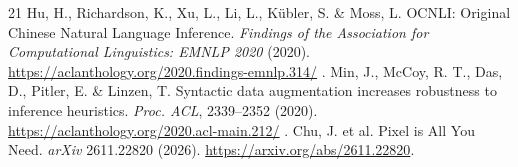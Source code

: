 \documentclass[12pt,a4paper]{article}
\providecommand{\DIFadd}[1]{{\protect\color{blue} \sf #1}} %
\providecommand{\DIFaddend}{} %
\begin{document}
\begin{thebibliography}{21}
{} \DIFadd{Hu, H., Richardson, K., Xu, L., Li, L., K\"ubler, S. \& Moss, L. OCNLI: Original Chinese Natural Language Inference. \emph{Findings of the Association for Computational Linguistics: EMNLP 2020} (2020). }\url{https://aclanthology.org/2020.findings-emnlp.314/}\DIFadd{.
} \DIFadd{Min, J., McCoy, R. T., Das, D., Pitler, E. \& Linzen, T. Syntactic data augmentation increases robustness to inference heuristics. \emph{Proc. ACL}, 2339--2352 (2020). }\url{https://aclanthology.org/2020.acl-main.212/}\DIFadd{.
} \DIFadd{Chu, J. et al. Pixel is All You Need. \emph{arXiv} 2611.22820 (2026). }\url{https://arxiv.org/abs/2611.22820}\DIFaddend .
\end{thebibliography}
\end{document}
